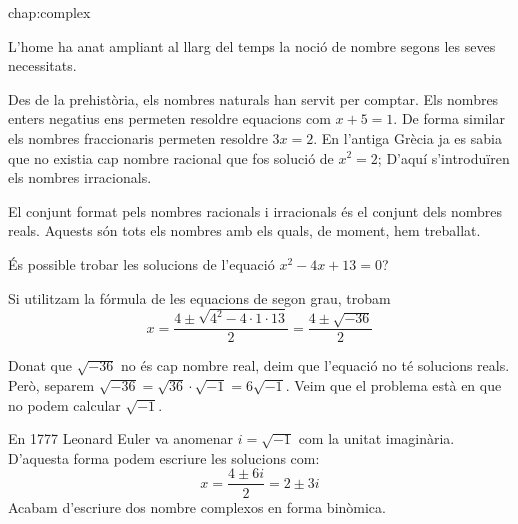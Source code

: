 
{chap:complex}
  
\begin{blueshaded}
	L'home ha anat ampliant al llarg del temps la noció de nombre segons les seves necessitats. 
	
	Des de la prehistòria, els nombres naturals han servit per comptar. Els nombres enters negatius ens permeten resoldre equacions com $x+5=1$. De forma similar els nombres fraccionaris permeten resoldre $3x=2$. En l'antiga Grècia ja es sabia que no existia cap nombre racional que fos solució de $x^2=2$; D'aquí s'introduïren els nombres irracionals.
	
	El conjunt format pels nombres racionals i irracionals és el conjunt dels nombres reals. Aquests són tots els nombres amb els quals, de moment, hem treballat. 
	
\end{blueshaded}   

\begin{bluebox}
 \fontsize{10.5}{11}
  És possible trobar les solucions de l'equació $x^2-4x+13=0$?
  
  Si utilitzam la fórmula de les equacions de segon grau, trobam
  \[ x = \dfrac{4\pm \sqrt{4^2-4 \cdot 1\cdot 13}}{2} = \dfrac{4\pm \sqrt{-36}}{2} \]
  
  Donat que $\sqrt{-36}$ no és cap nombre real, deim que l'equació no té solucions reals. Però, separem  $\sqrt{-36}= \sqrt{36} \cdot \sqrt{-1} = 6 \sqrt{-1}$. Veim que el problema està en que no podem calcular $\sqrt{-1}$. 
  
  En 1777 Leonard Euler va anomenar $i=\sqrt{-1}$ com la unitat imaginària. D'aquesta forma podem escriure les solucions com:
   \[ x =  \dfrac{4\pm 6 i}{2}  = 2 \pm 3i\]
  Acabam d'escriure dos nombre complexos en forma binòmica.
\end{bluebox} 

